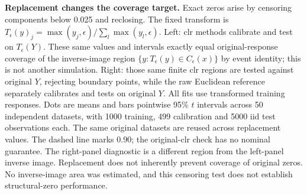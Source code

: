 \textbf{Replacement changes the coverage target.} Exact zeros arise by censoring components below 0.025 and reclosing. The fixed transform is $T_\epsilon(y)_j=\max(y_j,\epsilon)/\sum_l\max(y_l,\epsilon)$. Left: clr methods calibrate and test on $T_\epsilon(Y)$. These same values and intervals exactly equal original-response coverage of the inverse-image region $\{y:T_\epsilon(y)\in C_\epsilon(x)\}$ by event identity; this is not another simulation. Right: those same finite clr regions are tested against original $Y$, rejecting boundary points, while the raw Euclidean reference separately calibrates and tests on original $Y$. All fits use transformed training responses. Dots are means and bars pointwise 95\% $t$ intervals across 50 independent datasets, with 1000 training, 499 calibration and 5000 iid test observations each. The same original datasets are reused across replacement values. The dashed line marks 0.90; the original-clr check has no nominal guarantee. The right-panel diagnostic is a different region from the left-panel inverse image. Replacement does not inherently prevent coverage of original zeros. No inverse-image area was estimated, and this censoring test does not establish structural-zero performance.
